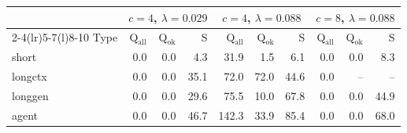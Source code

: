 \begin{tabular}{@{}lrrrrrrrrr@{}}
\toprule
 & \multicolumn{3}{c}{$c{=}4$, $\lambda{=}0.029$} & \multicolumn{3}{c}{$c{=}4$, $\lambda{=}0.088$} & \multicolumn{3}{c}{$c{=}8$, $\lambda{=}0.088$} \\
\cmidrule(lr){2-4}\cmidrule(lr){5-7}\cmidrule(l){8-10}
Type & Q$_{\mathrm{all}}$ & Q$_{\mathrm{ok}}$ & S & Q$_{\mathrm{all}}$ & Q$_{\mathrm{ok}}$ & S & Q$_{\mathrm{all}}$ & Q$_{\mathrm{ok}}$ & S \\
\midrule
short & 0.0 & 0.0 & 4.3 & 31.9 & 1.5 & 6.1 & 0.0 & 0.0 & 8.3 \\
longctx & 0.0 & 0.0 & 35.1 & 72.0 & 72.0 & 44.6 & 0.0 & -- & -- \\
longgen & 0.0 & 0.0 & 29.6 & 75.5 & 10.0 & 67.8 & 0.0 & 0.0 & 44.9 \\
agent & 0.0 & 0.0 & 46.7 & 142.3 & 33.9 & 85.4 & 0.0 & 0.0 & 68.0 \\
\bottomrule
\end{tabular}
